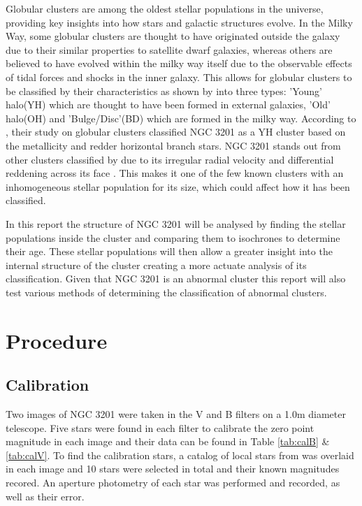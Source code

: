 \documentclass[11pt]{article}
\begin{document}
Globular clusters are among the oldest stellar populations in the universe, providing key insights into how stars and galactic structures evolve. In the Milky Way, some globular clusters are thought to have originated outside the galaxy due to their similar properties to satellite dwarf galaxies, whereas others are believed to have evolved within the milky way itself due to the observable effects of tidal forces and shocks in the inner galaxy. This allows for globular clusters to be classified by their characteristics as shown by \citet{Mackey} into three types: 'Young' halo(YH) which are thought to have been formed in external galaxies, 'Old' halo(OH) and 'Bulge/Disc'(BD) which are formed in the milky way. According to \citet{Mackey}, their study on globular clusters classified NGC 3201 as a YH cluster based on the metallicity and redder horizontal branch stars. NGC 3201 stands out from other clusters classified by \citet{Mackey} due to its irregular radial velocity and differential reddening across its face \citep{Kravtsov}. This makes it one of the few known clusters with an inhomogeneous stellar population for its size, which could affect how it has been classified.

In this report the structure of NGC 3201 will be analysed by finding the stellar populations inside the cluster and comparing them to isochrones to determine their age. These stellar populations will then allow a greater insight into the internal structure of the cluster creating a more actuate analysis of its classification. Given that NGC 3201 is an abnormal cluster this report will also test various methods of determining the classification of abnormal clusters.

\pagebreak
\section{Procedure}

\subsection{Calibration}

Two images of NGC 3201 were taken in the V and B filters on a 1.0m diameter telescope. Five stars were found in each filter to calibrate the zero point magnitude in each image and their data can be found in Table \ref{tab:calB} \& \ref{tab:calV}. To find the calibration stars, a catalog of local stars from \citet{simbad} was overlaid in each image and 10 stars were selected in total and their known magnitudes recored. An aperture photometry of each star was performed and recorded, as well as their error.
\end{document}
